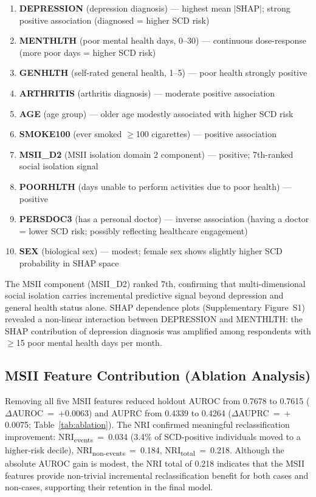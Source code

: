 \documentclass[12pt,a4paper]{article}
\begin{document}
\begin{enumerate}[noitemsep]
  \item \textbf{DEPRESSION} (depression diagnosis) --- highest mean $|$SHAP$|$;
        strong positive association (diagnosed = higher SCD risk)
  \item \textbf{MENTHLTH} (poor mental health days, 0--30) --- continuous
        dose-response (more poor days = higher SCD risk)
  \item \textbf{GENHLTH} (self-rated general health, 1--5) --- poor health
        strongly positive
  \item \textbf{ARTHRITIS} (arthritis diagnosis) --- moderate positive
        association
  \item \textbf{AGE} (age group) --- older age modestly associated with higher
        SCD risk
  \item \textbf{SMOKE100} (ever smoked $\geq$100 cigarettes) --- positive
        association
  \item \textbf{MSII\_D2} (MSII isolation domain 2 component) --- positive;
        7th-ranked social isolation signal
  \item \textbf{POORHLTH} (days unable to perform activities due to poor health)
        --- positive
  \item \textbf{PERSDOC3} (has a personal doctor) --- inverse association
        (having a doctor = lower SCD risk; possibly reflecting healthcare
        engagement)
  \item \textbf{SEX} (biological sex) --- modest; female sex shows slightly
        higher SCD probability in SHAP space
\end{enumerate}

The MSII component (MSII\_D2) ranked 7th, confirming that multi-dimensional
social isolation carries incremental predictive signal beyond depression and
general health status alone. SHAP dependence plots (Supplementary Figure~S1)
revealed a non-linear interaction between DEPRESSION and MENTHLTH: the SHAP
contribution of depression diagnosis was amplified among respondents with
$\geq$15 poor mental health days per month.

\subsection{MSII Feature Contribution (Ablation Analysis)}

Removing all five MSII features reduced holdout AUROC from 0.7678 to 0.7615
($\Delta$AUROC~=~$+$0.0063) and AUPRC from 0.4339 to 0.4264
($\Delta$AUPRC~=~$+$0.0075; Table~\ref{tab:ablation}). The NRI confirmed
meaningful reclassification improvement: NRI\textsubscript{events}~=~0.034
(3.4\% of SCD-positive individuals moved to a higher-risk decile),
NRI\textsubscript{non-events}~=~0.184, NRI\textsubscript{total}~=~0.218.
Although the absolute AUROC gain is modest, the NRI total of 0.218 indicates
that the MSII features provide non-trivial incremental reclassification benefit
for both cases and non-cases, supporting their retention in the final model.
\end{document}
